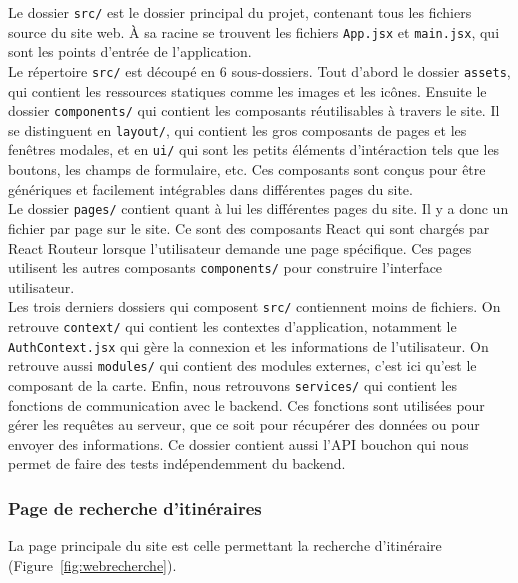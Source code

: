 \noindent Le dossier \texttt{src/} est le dossier principal du projet, contenant tous les fichiers source du site web. À sa racine se trouvent les fichiers \texttt{App.jsx} et \texttt{main.jsx}, qui sont les points d'entrée de l'application.\\

\noindent Le répertoire \texttt{src/} est découpé en 6 sous-dossiers. Tout d'abord le dossier \texttt{assets}, qui contient les ressources statiques comme les images et les icônes. Ensuite le dossier \texttt{components/} qui contient les composants réutilisables à travers le site.
Il se distinguent en \texttt{layout/}, qui contient les gros composants de pages et les fenêtres modales, et en \texttt{ui/} qui sont les petits éléments d'intéraction tels que les boutons, les champs de formulaire, etc. Ces composants sont conçus pour être génériques et facilement intégrables dans différentes pages du site.\\

\noindent Le dossier \texttt{pages/} contient quant à lui les différentes pages du site. Il y a donc un fichier par page sur le site. Ce sont des composants React qui sont chargés par React Routeur lorsque l'utilisateur demande une page spécifique.
Ces pages utilisent les autres composants \texttt{components/} pour construire l'interface utilisateur.\\

\noindent Les trois derniers dossiers qui composent \texttt{src/} contiennent moins de fichiers. On retrouve \texttt{context/} qui contient les contextes d'application, notamment le \texttt{AuthContext.jsx} qui gère la connexion et les informations de l'utilisateur.
On retrouve aussi \texttt{modules/} qui contient des modules externes, c'est ici qu'est le composant de la carte.
Enfin, nous retrouvons \texttt{services/} qui contient les fonctions de communication avec le backend.
Ces fonctions sont utilisées pour gérer les requêtes au serveur, que ce soit pour récupérer des données ou pour envoyer des informations. Ce dossier contient aussi l'API bouchon qui nous permet de faire des tests indépendemment du backend.\\

\subsubsection{Page de recherche d'itinéraires}
\label{sec:webrecherche}
\noindent La page principale du site est celle permettant la recherche d'itinéraire (Figure~\ref{fig:webrecherche}).

